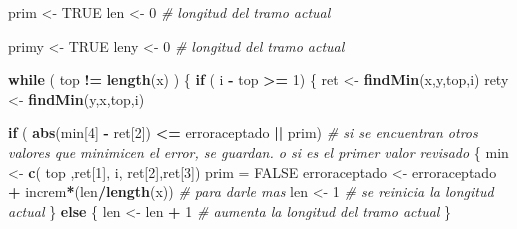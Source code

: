 \documentclass[]{article}
\newenvironment{Shaded}{\begin{snugshade}}{\end{snugshade}}
\newcommand{\KeywordTok}[1]{\textcolor[rgb]{0.13,0.29,0.53}{\textbf{#1}}}
\newcommand{\DecValTok}[1]{\textcolor[rgb]{0.00,0.00,0.81}{#1}}
\newcommand{\StringTok}[1]{\textcolor[rgb]{0.31,0.60,0.02}{#1}}
\newcommand{\CommentTok}[1]{\textcolor[rgb]{0.56,0.35,0.01}{\textit{#1}}}
\newcommand{\OtherTok}[1]{\textcolor[rgb]{0.56,0.35,0.01}{#1}}
\newcommand{\ControlFlowTok}[1]{\textcolor[rgb]{0.13,0.29,0.53}{\textbf{#1}}}
\newcommand{\OperatorTok}[1]{\textcolor[rgb]{0.81,0.36,0.00}{\textbf{#1}}}
\newcommand{\NormalTok}[1]{#1}
\begin{document}
\begin{Shaded}
\begin{Highlighting}[]
\NormalTok{  prim   <-}\StringTok{ }\OtherTok{TRUE}
\NormalTok{  len    <-}\StringTok{ }\DecValTok{0} \CommentTok{# longitud del tramo actual }
  
\NormalTok{  primy   <-}\StringTok{ }\OtherTok{TRUE}
\NormalTok{  leny    <-}\StringTok{ }\DecValTok{0} \CommentTok{# longitud del tramo actual }
  
  \ControlFlowTok{while}\NormalTok{ ( top }\OperatorTok{!=}\StringTok{ }\KeywordTok{length}\NormalTok{(x) )}
\NormalTok{  \{}
    \ControlFlowTok{if}\NormalTok{ ( i }\OperatorTok{-}\StringTok{ }\NormalTok{top }\OperatorTok{>=}\StringTok{ }\DecValTok{1}\NormalTok{)}
\NormalTok{    \{}
\NormalTok{      ret <-}\StringTok{ }\KeywordTok{findMin}\NormalTok{(x,y,top,i) }
\NormalTok{      rety <-}\StringTok{ }\KeywordTok{findMin}\NormalTok{(y,x,top,i) }
      
      \ControlFlowTok{if}\NormalTok{ ( }\KeywordTok{abs}\NormalTok{(min[}\DecValTok{4}\NormalTok{] }\OperatorTok{-}\StringTok{ }\NormalTok{ret[}\DecValTok{2}\NormalTok{]) }\OperatorTok{<=}\StringTok{ }\NormalTok{erroraceptado }\OperatorTok{||}\StringTok{ }\NormalTok{prim) }\CommentTok{# si se encuentran otros valores que minimicen el error, se guardan. o si es el primer valor revisado}
\NormalTok{      \{}
\NormalTok{        min <-}\StringTok{ }\KeywordTok{c}\NormalTok{( top ,ret[}\DecValTok{1}\NormalTok{], i, ret[}\DecValTok{2}\NormalTok{],ret[}\DecValTok{3}\NormalTok{])}
\NormalTok{        prim =}\StringTok{ }\OtherTok{FALSE}
\NormalTok{        erroraceptado <-}\StringTok{ }\NormalTok{erroraceptado }\OperatorTok{+}\StringTok{ }\NormalTok{increm}\OperatorTok{*}\NormalTok{(len}\OperatorTok{/}\KeywordTok{length}\NormalTok{(x)) }\CommentTok{# para darle mas }
\NormalTok{        len <-}\StringTok{ }\DecValTok{1} \CommentTok{# se reinicia la longitud actual }
\NormalTok{      \}}
      \ControlFlowTok{else}
\NormalTok{      \{}
\NormalTok{        len <-}\StringTok{ }\NormalTok{len }\OperatorTok{+}\StringTok{ }\DecValTok{1} \CommentTok{# aumenta la longitud del tramo actual}
\NormalTok{      \}}
      

\end{Highlighting}
\end{Shaded}
\end{document}
